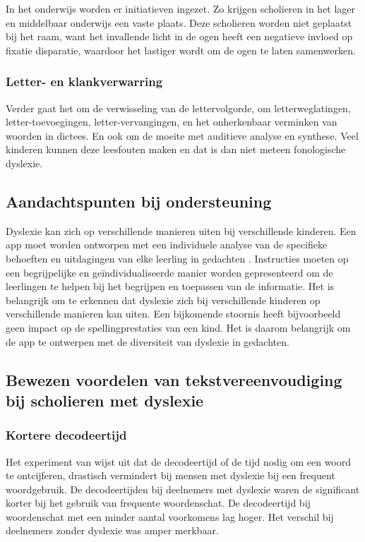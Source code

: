 In het onderwijs worden er initiatieven ingezet. Zo krijgen scholieren in het lager en middelbaar onderwijs een vaste plaats. Deze scholieren worden niet geplaatst bij het raam, want het invallende licht in de ogen heeft een negatieve invloed op fixatie disparatie, waardoor het lastiger wordt om de ogen te laten samenwerken. \autocite{Bezem2016}

\subsubsection{Letter- en klankverwarring}

Verder gaat het om de verwisseling van de lettervolgorde, om letterweglatingen, letter-toevoegingen, letter-vervangingen, en het onherkenbaar verminken van woorden in dictees. En ook om de moeite met auditieve analyse en synthese. Veel kinderen kunnen deze leesfouten maken en dat is dan niet meteen fonologische dyslexie.

\subsection{Aandachtspunten bij ondersteuning}

Dyslexie kan zich op verschillende manieren uiten bij verschillende kinderen. Een app moet worden ontworpen met een individuele analyse van de specifieke behoeften en uitdagingen van elke leerling in gedachten \autocite{Uhry2008, Gooding2018}. Instructies moeten op een begrijpelijke en geïndividualiseerde manier worden gepresenteerd om de leerlingen te helpen bij het begrijpen en toepassen van de informatie. Het is belangrijk om te erkennen dat dyslexie zich bij verschillende kinderen op verschillende manieren kan uiten. Een bijkomende stoornis heeft bijvoorbeeld geen impact op de spellingprestaties van een kind. Het is daarom belangrijk om de app te ontwerpen met de diversiteit van dyslexie in gedachten.

\subsection{Bewezen voordelen van tekstvereenvoudiging bij scholieren met dyslexie}

\subsubsection{Kortere decodeertijd}

Het experiment van \textcite{Rello2013} wijst uit dat de decodeertijd of de tijd nodig om een woord te ontcijferen, drastisch vermindert bij mensen met dyslexie bij een frequent woordgebruik. De decodeertijden bij deelnemers met dyslexie waren de significant korter bij het gebruik van frequente woordenschat. De decodeertijd bij woordenschat met een minder aantal voorkomens lag hoger. Het verschil bij deelnemers zonder dyslexie was amper merkbaar.

